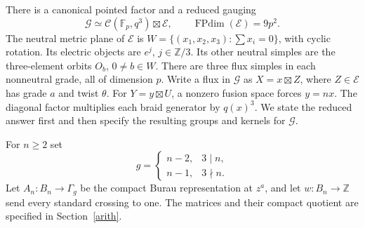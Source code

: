 \documentclass[11pt]{amsart}
\newcommand{\Fp}{\mathbb F_p}
\newcommand{\FPdim}{\operatorname{FPdim}}
\begin{document}
There is a canonical pointed factor and a reduced gauging
\begin{equation}\label{split}
\mathcal G\simeq\mathcal C(\Fp,q^3)\boxtimes\mathcal E,
\qquad\FPdim(\mathcal E)=9p^2.
\end{equation}
The neutral metric plane of $\mathcal E$ is
$W=\{(x_1,x_2,x_3):\sum x_i=0\}$, with cyclic rotation.
Its electric objects are $e^j$, $j\in\mathbb Z/3$.
Its other neutral simples are the three-element orbits $O_b$,
$0\ne b\in W$. There are three flux simples in each nonneutral grade,
all of dimension $p$. Write a flux in $\mathcal G$ as $X=x\boxtimes Z$,
where $Z\in\mathcal E$ has grade $a$ and twist $\theta$.
For $Y=y\boxtimes U$, a nonzero fusion space forces $y=nx$.
The diagonal factor multiplies each braid generator by $q(x)^3$.
We state the reduced answer first and then specify the resulting groups
and kernels for $\mathcal G$.

For $n\ge2$ set
\[
g=\begin{cases}n-2,&3\mid n,\\n-1,&3\nmid n.\end{cases}
\]
Let $A_n:B_n\to\Gamma_g$ be the compact Burau representation at
$z^a$, and let $w:B_n\to\mathbb Z$ send every standard crossing to one.
The matrices and their compact quotient are specified in Section~\ref{arith}.
\end{document}
